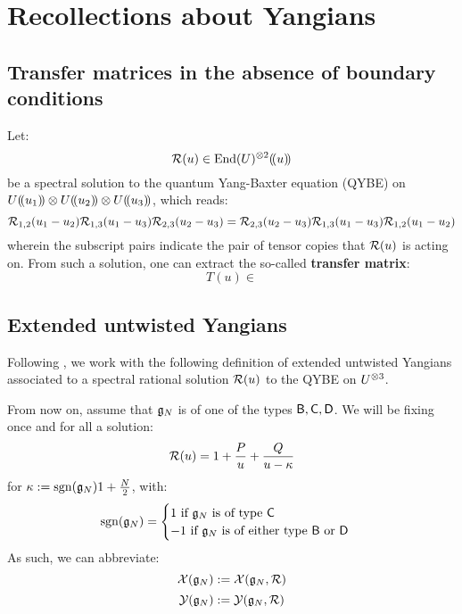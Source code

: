     \section{Recollections about Yangians}
        \subsection{Transfer matrices in the absence of boundary conditions}
            Let:
                $$\calR(u) \in \End(U)^{\tensor 2}(\!(u)\!)$$
            be a spectral solution to the quantum Yang-Baxter equation (QYBE) on $U(\!(u_1)\!) \tensor U(\!(u_2)\!) \tensor U(\!(u_3)\!)$, which reads:
                \begin{equation} \label{equation: QYBE}
                    \mathcal{R}_{1, 2}(u_1 - u_2) \mathcal{R}_{1, 3}(u_1 - u_3) \mathcal{R}_{2, 3}(u_2 - u_3) = \mathcal{R}_{2, 3}(u_2 - u_3) \mathcal{R}_{1, 3}(u_1 - u_3) \mathcal{R}_{1, 2}(u_1 - u_2)
                \end{equation}
            wherein the subscript pairs indicate the pair of tensor copies that $\mathcal{R}(u)$ is acting on. From such a solution, one can extract the so-called \textbf{transfer matrix}:
                $$T(u) \in $$

        \subsection{Extended untwisted Yangians}
            Following \cite[Definition 2.1]{guay_regelskis_twisted_yangians_for_symmetric_pairs_of_types_BCD}, we work with the following definition of extended untwisted Yangians associated to a spectral rational solution $\mathcal{R}(u)$ to the QYBE on $U^{\tensor 3}$.
            \begin{definition} \label{def: extended_untwisted_yangians}
                
            \end{definition}
            \begin{definition} \label{def: untwisted_yangians}
                
            \end{definition}

            From now on, assume that $\mathfrak{g}_N$ is of one of the types $\mathsf{B}, \mathsf{C}, \mathsf{D}$. We will be fixing once and for all a solution:
                $$\mathcal{R}(u) = 1 + \frac{P}{u} + \frac{Q}{u - \kappa}$$
            for $\kappa := \operatorname{sgn}(\mathfrak{g}_N) 1 + \frac{N}{2}$, with:
                \begin{equation} \label{equation: BCD_signature}
                    \operatorname{sgn}(\mathfrak{g}_N) =
                    \begin{cases}
                        \text{$1$ if $\mathfrak{g}_N$ is of type $\mathsf{C}$}
                        \\
                        \text{$-1$ if $\mathfrak{g}_N$ is of either type $\mathsf{B}$ or $\mathsf{D}$}
                    \end{cases}
                \end{equation}
            As such, we can abbreviate:
                $$\mathcal{X}(\mathfrak{g}_N) := \mathcal{X}(\mathfrak{g}_N, \mathcal{R})$$
                $$\mathcal{Y}(\mathfrak{g}_N) := \mathcal{Y}(\mathfrak{g}_N, \mathcal{R})$$

